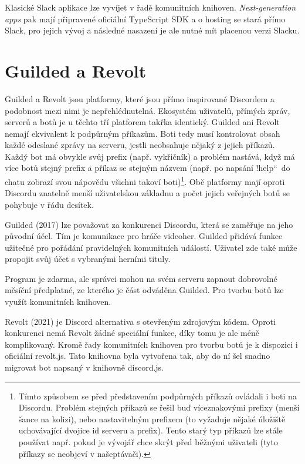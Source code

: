 \documentclass[FM]{tulthesis}
\begin{document}
	Klasické Slack aplikace lze vyvíjet v řadě komunitních knihoven. \textit{Next-generation apps} pak mají připravené oficiální \mbox{TypeScript} SDK a o hosting se stará přímo Slack, pro jejich vývoj a následné nasazení je ale nutné mít placenou verzi Slacku.
	
	\section{Guilded a Revolt}
	
	Guilded a Revolt jsou platformy, které jsou přímo inspirované Discordem a podobnost mezi nimi je nepřehlédnutelná. Ekosystém uživatelů, přímých zpráv, serverů a botů je u těchto tří platforem takřka identický. Guilded ani Revolt nemají ekvivalent k podpůrným příkazům. Boti tedy musí kontrolovat obsah každé odeslané zprávy na serveru, jestli neobsahuje nějaký z jejich příkazů. Každý bot má obvykle svůj prefix (např. vykřičník) a problém nastává, když má více botů stejný prefix a příkaz se stejným názvem (např. po napsání \quotedblbase!help\textquotedblleft\ do chatu zobrazí svou nápovědu všichni takoví boti)\footnote{Tímto způsobem se před představením podpůrných příkazů ovládali i boti na Discordu. Problém stejných příkazů se řešil buď víceznakovými prefixy (menší šance na kolizi), nebo nastavitelným prefixem (to vyžaduje nějaké úložiště uchovávající dvojice id serveru a prefix). Tento starý typ příkazů lze stále používat např. pokud je vývojář chce skrýt před běžnými uživateli (tyto příkazy se neobjeví v našeptávači).}. Obě platformy mají oproti Discordu znatelně menší uživatelskou základnu a počet jejich veřejných botů se pohybuje v řádu desítek.
	
	Guilded (2017) lze považovat za konkurenci Discordu, která se zaměřuje na jeho původní účel. Tím je komunikace pro hráče videoher. Guilded přidává funkce užitečné pro pořádání pravidelných komunitních událostí. Uživatel zde také může propojit svůj účet s vybranými herními tituly. \cite{web_guilded} 
	
	Program je zdarma, ale správci mohou na svém serveru zapnout dobrovolné měsíční předplatné, ze kterého je část odváděna Guilded. Pro tvorbu botů lze využít komunitních knihoven.
	
	Revolt (2021) je Discord alternativa s otevřeným zdrojovým kódem. Oproti konkurenci nemá Revolt žádné speciální funkce, díky tomu je ale méně komplikovaný. Kromě řady komunitních knihoven pro tvorbu botů je k dispozici i oficiální revolt.js. Tato knihovna byla vytvořena tak, aby do ní šel snadno migrovat bot napsaný v knihovně discord.js.
	
\end{document}
